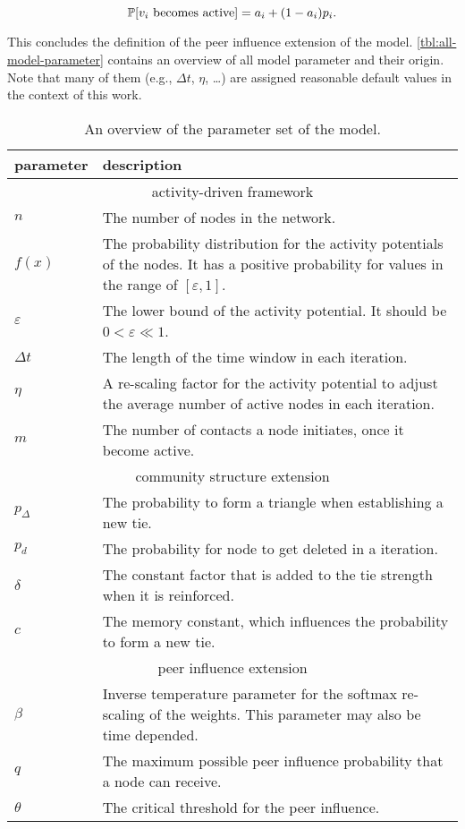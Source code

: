 \begin{equation}
    \mathbb{P}[{v_i \text{ becomes active}}] = a_{i} + (1 - a_{i}) p_{i}.
\end{equation}

This concludes the definition of the peer influence extension of the model.
\autoref{tbl:all-model-parameter} contains an overview of all model parameter and their origin.
Note that many of them (e.g., \( \Delta t \), \( \eta \), \ldots) are assigned reasonable default values in the context of this work.

\begin{table}[h]
\centering
\begin{tabular}{lp{10cm}}
\hline
\textbf{parameter} & \textbf{description} \\ \hline \hline
\multicolumn{2}{c}{activity-driven framework} \\ \hline
\( n \) & The number of nodes in the network. \\
\( f(x) \) & The probability distribution for the activity potentials of the nodes. It has a positive probability for values in the range of \( [\varepsilon, 1] \). \\
\( \varepsilon \) &  The lower bound of the activity potential. It should be \( 0 < \varepsilon \ll 1 \). \\
\( \Delta t \) &  The length of the time window in each iteration. \\
\( \eta \) &  A re-scaling factor for the activity potential to adjust the average number of active nodes in each iteration. \\
\( m \) & The number of contacts a node initiates, once it become active. \\ \hline \hline

\multicolumn{2}{c}{community structure extension} \\ \hline
\( p_{\Delta} \) & The probability to form a triangle when establishing a new tie. \\
\( p_{d} \) & The probability for node to get deleted in a iteration. \\
\( \delta \) & The constant factor that is added to the tie strength when it is reinforced. \\
\( c \) &  The memory constant, which influences the probability to form a new tie.\\ \hline \hline

\multicolumn{2}{c}{peer influence extension} \\ \hline
\( \beta \) & Inverse temperature parameter for the softmax re-scaling of the weights. This parameter may also be time depended. \\
\( q \) & The maximum possible peer influence probability that a node can receive. \\
\( \theta \) & The critical threshold for the peer influence.  \\ \hline
\end{tabular}

\caption{An overview of the parameter set of the model.}
\label{tbl:all-model-parameter}
\end{table}
